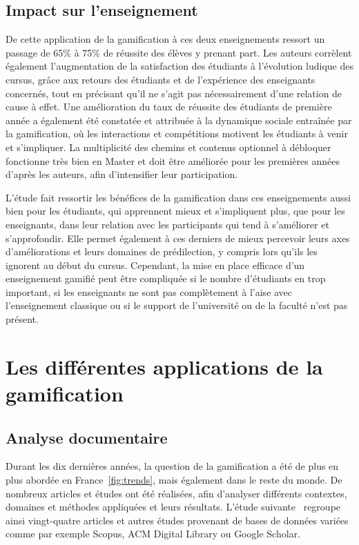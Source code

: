 \subsection{Impact sur l'enseignement}
De cette application de la gamification à ces deux enseignements ressort un passage de 65\% à 75\% de réussite des élèves y prenant part. Les auteurs corrèlent également l'augmentation de la satisfaction des étudiants à l'évolution ludique des cursus, grâce aux retours des étudiants et de l'expérience des enseignants concernés, tout en précisant qu'il ne s'agit pas nécessairement d'une relation de cause à effet. Une amélioration du taux de réussite des étudiants de première année a également été constatée et attribuée à la dynamique sociale entraînée par la gamification, où les interactions et compétitions motivent les étudiants à venir et s’impliquer. La multiplicité des chemins et contenus optionnel à débloquer fonctionne très bien en Master et doit être améliorée pour les premières années d’après les auteurs, afin d’intensifier leur participation. \par

L’étude fait ressortir les bénéfices de la gamification dans ces enseignements aussi bien pour les étudiants, qui apprennent mieux et s’impliquent plus, que pour les enseignants, dans leur relation avec les participants qui tend à s’améliorer et s’approfondir. Elle permet également à ces derniers de mieux percevoir leurs axes d’améliorations et leurs domaines de prédilection, y compris lors qu’ils les ignorent au début du cursus. Cependant, la mise en place efficace d’un enseignement gamifié peut être compliquée si le nombre d’étudiants en trop important, si les enseignants ne sont pas complètement à l’aise avec l’enseignement classique ou si le support de l’université ou de la faculté n’est pas présent.

\section{Les différentes applications de la gamification}
\subsection{Analyse documentaire}
Durant les dix dernières années, la question de la gamification a été de plus en plus abordée en France~\ref{fig:trends}, mais également dans le reste du monde. De nombreux articles et études ont été réalisées, afin d'analyser différents contextes, domaines et méthodes appliquées et leurs résultats. L'étude suivante~\cite{gamif-review} regroupe ainsi vingt-quatre articles et autres études provenant de bases de données variées comme par exemple Scopus, ACM Digital Library ou Google Scholar. \par

